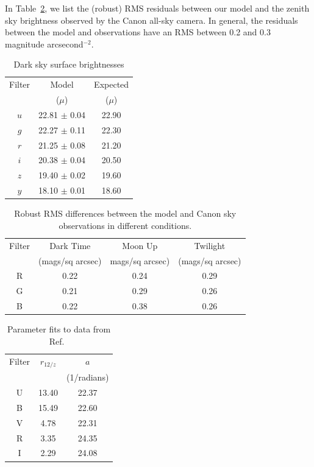 \documentclass[]{spie}
\begin{document}
In Table~\ref{table:zenithRMSSky}, we list the (robust) RMS residuals between our model and the zenith sky brightness observed by the Canon all-sky camera. In general, the residuals between the model and observations have an RMS between 0.2 and 0.3 magnitude arcsecond$^{-2}$.  


\begin{table}
  \caption{Dark sky surface brightnesses }
  \label{table:darkSky}
  \begin{center}
  \begin{tabular}{c c  c}
  Filter & Model & Expected\cite{Ivezic08} \\
  & ($\mu$) &  ($\mu$)  \\
  \hline
  \hline
  $u$ &    22.81 $\pm$  0.04  &  22.90 \\
  $g$ &    22.27 $\pm$  0.11  &  22.30 \\
  $r$ &    21.25 $\pm$  0.08  &  21.20 \\
  $i$ &    20.38 $\pm$  0.04  &  20.50 \\
  $z$ &    19.40 $\pm$  0.02  &  19.60 \\
  $y$ &    18.10 $\pm$  0.01  &  18.60 
  \end{tabular}
  \end{center}
\end{table}


\begin{table}
  
  \caption{ Robust RMS differences between the model and Canon sky observations in different conditions.}
  \label{table:zenithRMSSky}
  \begin{center}
  \begin{tabular}{c c c c}
  Filter & Dark Time & Moon Up & Twilight \\
  & (mags/sq arcsec)   & mags/sq arcsec) & (mags/sq arcsec) \\
  \hline
  \hline
  R & 0.22 & 0.24 & 0.29 \\
  G & 0.21 & 0.29 & 0.26 \\
  B & 0.22 & 0.38 & 0.26 
  \end{tabular}
  \end{center}
\end{table}


\begin{table}
  \caption{Parameter fits to data from Ref.~}
  \label{table:PatatFits}
  \begin{center}
  \begin{tabular}{c c c}
  Filter & $r_{12/z}$ & $a$  \\
  & & (1/radians) \\
  \hline
  \hline
  U & 13.40 & 22.37 \\
  B & 15.49 & 22.60 \\
  V & 4.78  & 22.31 \\
  R & 3.35  & 24.35 \\
  I & 2.29  & 24.08
\end{tabular}
\end{center}
\end{table}
\end{document}
